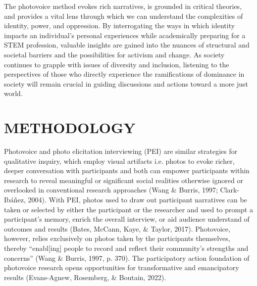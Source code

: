 \documentclass{sig-alternate} %
\begin{document}
\begin{large}
The photovoice method evokes rich narratives, is grounded in critical theories, and provides a vital lens through which we can understand the complexities of identity, power, and oppression. By interrogating the ways in which identity impacts an individual’s personal experiences while academically preparing for a STEM profession, valuable insights are gained into the nuances of structural and societal barriers and the possibilities for activism and change. As society continues to grapple with issues of diversity and inclusion, listening to the perspectives of those who directly experience the ramifications of dominance in society will remain crucial in guiding discussions and actions toward a more just world.

\section*{METHODOLOGY}
Photovoice and photo elicitation interviewing (PEI) are similar strategies for qualitative inquiry, which employ visual artifacts i.e. photos to evoke richer, deeper conversation with participants and both can empower participants within research to reveal meaningful or significant social realities otherwise ignored or overlooked in conventional research approaches (Wang \& Burris, 1997; Clark-Ibáñez, 2004). With PEI, photos used to draw out participant narratives can be taken or selected by either the participant or the researcher and used to prompt a participant’s memory, enrich the overall interview, or aid audience understand of outcomes and results (Bates, McCann, Kaye, \& Taylor, 2017). Photovoice, however, relies exclusively on photos taken by the participants themselves, thereby “enabl[ing] people to record and reflect their community’s strengths and concerns” (Wang \& Burris, 1997, p. 370). The participatory action foundation of photovoice research opens opportunities for transformative and emancipatory results (Evans-Agnew, Rosemberg, \& Boutain, 2022). 


\end{large}
\end{document}

